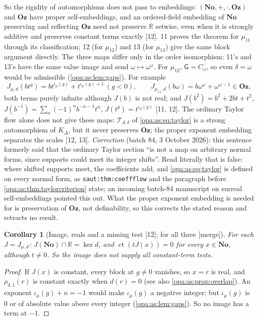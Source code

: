 \documentclass[11pt,oneside]{article}
\numberwithin{equation}{section}
\newtheorem{corollary}[corollary]{Corollary}
\theoremstyle{definition}
\theoremstyle{remark}
\newcommand{\No}{\mathbf{No}}
\newcommand{\Oz}{\mathbf{Oz}}
\newcommand{\R}{\mathbb R}
\newcommand{\ct}{\operatorname{ct}}
\newcommand{\src}[1]{\textup{\textsf{\small[#1]}}}
\newcommand{\mergetag}{\textup{\textsf{\small[merge]}}}
\newcommand{\lbl}[1]{\nolinkurl{#1}}
\newcommand{\gap}{\mathsf G}
\begin{document}
So the rigidity of automorphisms does not pass to embeddings: $(\No,+,\cdot,\Oz)$ and $\Oz$ have
proper self-embeddings, and an ordered-field embedding of $\No$ preserving and reflecting $\Oz$ need
not preserve $\R$ setwise, even when it is strongly additive and preserves constant terms exactly
\src{12}. 11 proves the theorem for $\mu_{11}$ through its classification; 12 (for $\mu_{12}$) and 13
(for $\mu_{13}$) give the same block argument directly. The three maps differ only in the order isomorphism: 11's and
13's have the same value image and send $\omega\mapsto\omega^\omega$. For $\mu_{12}$, $\gap=C_\omega$, so even
$\delta=\omega$ would be admissible (\cref{opa:as:lem:gaps}). For example
\[
 J_{\mu,d}(bt^g)=bt^{\iota_\mu(g)}+t^{\iota_\mu(g)+1}\ (g<0),\qquad
 J_{\mu_{11},d}(b\omega)=b\omega^\omega+\omega^{\omega-1}\in\Oz,
\]
both terms purely infinite although $J(b)$ is not real; and
$J(b^2)=b^2+2bt+t^2$, $J(b^{-1})=\sum_n(-1)^nb^{-n-1}t^n$, $J(t^g)=t^{\iota_\mu(g)}$ \src{11, 12}.
The ordinary Taylor flow alone does not give these maps: $\mathcal T_{d,\delta}$ of \eqref{opa:as:eq:taylor}
is a strong automorphism of $K_\Delta$, but it never preserves $\Oz$; the proper exponent embedding
separates the scales \src{12, 13}. \emph{Correction} (batch 84, 3 October 2026): this sentence formerly
said that the ordinary Taylor section ``is not a map on arbitrary normal forms, since supports could meet
its integer shifts''. Read literally that is false: where shifted supports meet, the coefficients add, and
\eqref{opa:as:eq:taylor} is defined on every normal form, as \lbl{saut:thm:coeffflow} and the paragraph
before \cref{opa:as:thm:taylorcriterion} state; an incoming batch-84 manuscript on surreal
self-embeddings pointed this out. What the proper exponent embedding is needed for is preservation of
$\Oz$, not definability, so this corrects the stated reason and retracts no result.

\begin{corollary}[Image, reals and a missing test \src{12}; for all three \mergetag]\label{opa:as:cor:image}
For each $J=J_{\mu,d}$: $J(\No)\cap\R=\ker d$, and $\ct(tJ(x))=0$ for every $x\in\No$, although
$t\ne0$. So the image does not supply all constant-term tests.
\end{corollary}
\begin{proof}
If $J(x)$ is constant, every block at $g\ne0$ vanishes, so $x=r$ is real, and $\rho_{d,1}(r)$ is constant
exactly when $d(r)=0$ (see also \cref{opa:as:prop:overlap}). An exponent $\iota_\mu(g)+n=-1$ would make
$\iota_\mu(g)$ a negative integer; but $\iota_\mu(g)$ is $0$ or of absolute value above every integer
(\cref{opa:as:lem:gaps}). So no image has a term at $-1$.
\end{proof}
\end{document}
